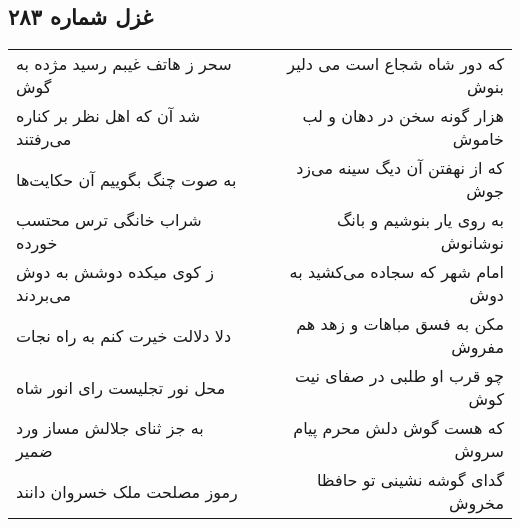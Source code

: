\begin{center}
\section*{غزل شماره ۲۸۳}
\label{sec:sh283}
\begin{longtable}{l p{0.5cm} r}
سحر ز هاتف غیبم رسید مژده به گوش
&&
که دور شاه شجاع است می دلیر بنوش
\\
شد آن که اهل نظر بر کناره می‌رفتند
&&
هزار گونه سخن در دهان و لب خاموش
\\
به صوت چنگ بگوییم آن حکایت‌ها
&&
که از نهفتن آن دیگ سینه می‌زد جوش
\\
شراب خانگی ترس محتسب خورده
&&
به روی یار بنوشیم و بانگ نوشانوش
\\
ز کوی میکده دوشش به دوش می‌بردند
&&
امام شهر که سجاده می‌کشید به دوش
\\
دلا دلالت خیرت کنم به راه نجات
&&
مکن به فسق مباهات و زهد هم مفروش
\\
محل نور تجلیست رای انور شاه
&&
چو قرب او طلبی در صفای نیت کوش
\\
به جز ثنای جلالش مساز ورد ضمیر
&&
که هست گوش دلش محرم پیام سروش
\\
رموز مصلحت ملک خسروان دانند
&&
گدای گوشه نشینی تو حافظا مخروش
\\
\end{longtable}
\end{center}
